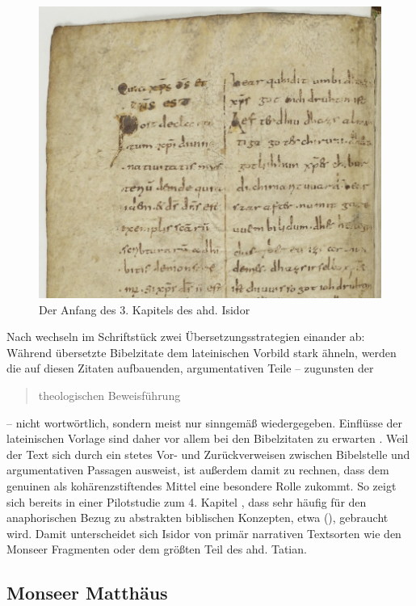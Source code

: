 \begin{figure}[h]
\begin{center}
  \includegraphics[width=10 cm]{images/isidor-kap-3-ausschnitt.jpg}
  \caption {Der Anfang des 3. Kapitels des ahd. Isidor}
\label{abb:isidor4}
\end{center}
\end{figure} 


Nach \textcite{Matzel1970} wechseln im Schriftstück zwei Übersetzungsstrategien einander ab: Während übersetzte Bibelzitate dem lateinischen Vorbild stark ähneln, werden die auf diesen Zitaten aufbauenden, argumentativen Teile -- zugunsten der \blockcquote[357]{Matzel1970}{theologischen Beweisführung} -- nicht wortwörtlich, sondern meist nur sinngemäß wiedergegeben. Einflüsse der lateinischen Vorlage sind daher vor allem bei den Bibelzitaten zu erwarten \parencites()()[33]{Fleischer2006}[45--46]{Schlachter2012}. Weil der Text sich durch ein stetes Vor- und Zurückverweisen zwischen Bibelstelle und argumentativen Passagen ausweist, ist außerdem damit zu rechnen, dass dem genuinen   als kohärenzstiftendes Mittel eine besondere Rolle zukommt. So zeigt sich bereits in einer Pilotstudie zum 4. Kapitel \parencite[s.][]{Szczepaniak2015}, dass  sehr häufig für den anaphorischen Bezug zu abstrakten biblischen Konzepten, etwa  (), gebraucht wird. Damit unterscheidet sich Isidor von primär narrativen Textsorten wie den Monseer Fragmenten oder dem größten Teil des ahd. Tatian.   


\subsection{Monseer Matthäus} \label{sec:monsee}

